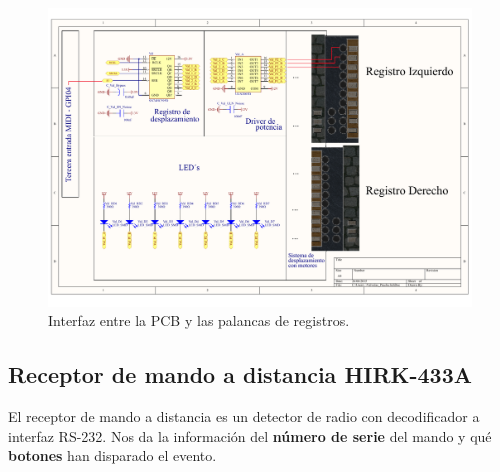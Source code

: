 \begin{figure}[H]
	\noindent \begin{centering}
		\includegraphics[width=\linewidth]{capitulo3/pcb_registros}
		\par\end{centering}
	\smallskip
	\caption{\label{fig:pcb_registros} Interfaz entre la PCB y las palancas de registros.}
\end{figure} 

\smallskip

\subsection{Receptor de mando a distancia HIRK-433A}
\label{analisis_mando}

El receptor de mando a distancia es un detector de radio con decodificador a interfaz RS-232. Nos da la información del \textbf{número de serie} del mando y qué \textbf{botones} han disparado el evento. 

\smallskip


